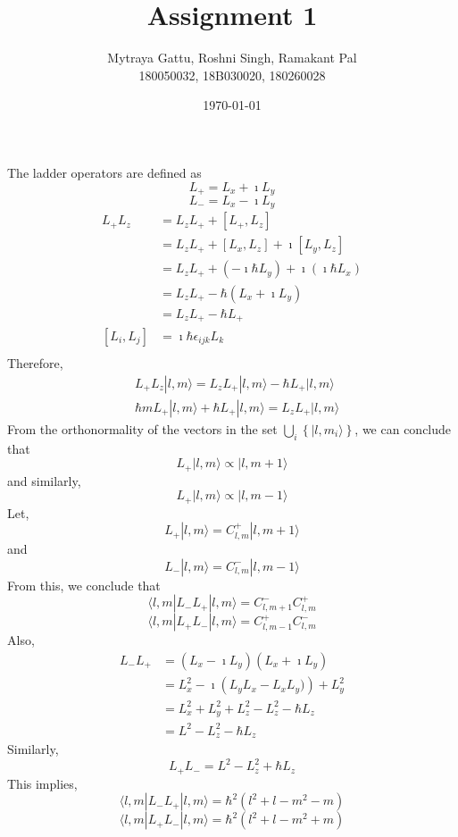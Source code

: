 \documentclass{article}
\title{Assignment 1}
\author{Mytraya Gattu, Roshni Singh, Ramakant Pal\\ 180050032, 18B030020, 180260028}
\date{\today}
\begin{document}
\maketitle
The ladder operators are defined as
$$L_{+} = L_{x} + \imath L_{y}$$
$$L_{-} = L_{x} - \imath L_{y}$$
\begin{align*}
    L_{+}L_{z} & = L_{z}L_{+} + [L_{+},L_{z}] \\
    & = L_{z}L_{+} + [L_{x},L_{z}] + \imath [L_{y},L_{z}] \\
    & = L_{z}L_{+} + (-\imath \hbar L_{y}) + \imath (\imath \hbar L_{x}) \\
    & = L_{z}L_{+} -\hbar (L_{x} + \imath L_{y} ) \\
    & = L_{z}L_{+} -\hbar L_{+} \\
    \left[L_{i},L_{j}\right] & =  \imath \hbar \epsilon_{ijk}L_{k}  \\
\end{align*}
Therefore,
\begin{align*}
    & L_{+}L_{z} | l,m \rangle  = L_{z}L_{+} | l,m \rangle - \hbar L_{+} | l,m \rangle \\
    & \hbar mL_{+} | l,m \rangle + \hbar L_{+} | l,m \rangle = L_{z}L_{+} | l,m \rangle
\end{align*}
From the orthonormality of the vectors in the set $\bigcup_{i} \left\{|l,m_{i} \rangle \right\}$, we can conclude that
$$L_{+} | l,m \rangle \propto |l, m+1 \rangle$$ and similarly,
$$L_{+} | l,m \rangle \propto |l, m-1 \rangle$$
Let,
$$L_{+} | l,m \rangle = C^{+}_{l,m} | l,m+1 \rangle$$ and
$$L_{-} | l,m \rangle = C^{-}_{l,m} | l,m-1 \rangle$$
From this, we conclude that
$$\langle l,m | L_{-}L_{+} | l,m \rangle = C^{-}_{l,m+1}C^{+}_{l,m}$$
$$\langle l,m | L_{+}L_{-} | l,m \rangle = C^{+}_{l,m-1}C^{-}_{l,m}$$
Also,
\begin{align*}
L_{-}L_{+} & = \left( L_{x} - \imath L_{y} \right)\left( L_{x} + \imath L_{y} \right) \\
    & = L^{2}_{x} -\imath \left( L_{y}L_{x} - L_{x}L_{y}) \right) + L^{2}_{y} \\
    & = L^{2}_{x} + L^{2}_{y} + L^{2}_{z} - L^{2}_{z} - \hbar L_{z} \\
    & = L^{2} - L^{2}_{z} - \hbar L_{z}
\end{align*}
 Similarly,
$$L_{+}L_{-} = L^{2} - L^{2}_{z} + \hbar L_{z} $$
This implies,
$$\langle l,m | L_{-}L_{+} | l, m \rangle = \hbar^{2} (l^{2} + l - m^{2} - m)$$
$$\langle l,m | L_{+}L_{-} | l, m \rangle = \hbar^{2} (l^{2} + l - m^{2} + m)$$
\end{document}
